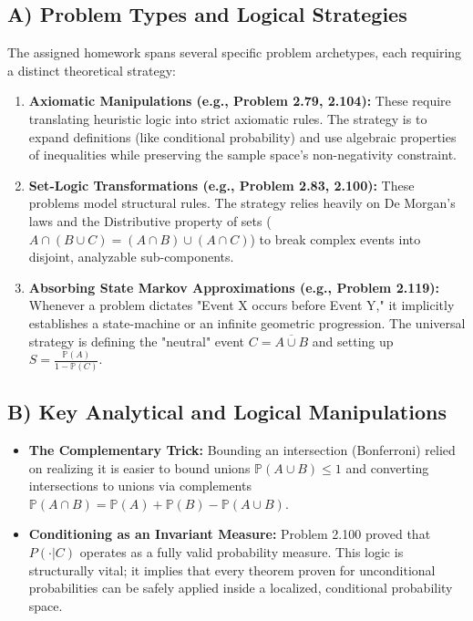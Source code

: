 \documentclass[12pt]{article}
\theoremstyle{definition}
\theoremstyle{remark}
\begin{document}
\subsection{A) Problem Types and Logical Strategies}
The assigned homework spans several specific problem archetypes, each requiring a distinct theoretical strategy:
\begin{enumerate}
    \item \textbf{Axiomatic Manipulations (e.g., Problem 2.79, 2.104):} These require translating heuristic logic into strict axiomatic rules. The strategy is to expand definitions (like conditional probability) and use algebraic properties of inequalities while preserving the sample space's non-negativity constraint.
    \item \textbf{Set-Logic Transformations (e.g., Problem 2.83, 2.100):} These problems model structural rules. The strategy relies heavily on De Morgan's laws and the Distributive property of sets ($A \cap (B \cup C) = (A \cap B) \cup (A \cap C)$) to break complex events into disjoint, analyzable sub-components.
    \item \textbf{Absorbing State Markov Approximations (e.g., Problem 2.119):} Whenever a problem dictates "Event X occurs before Event Y," it implicitly establishes a state-machine or an infinite geometric progression. The universal strategy is defining the "neutral" event $C = \overline{A \cup B}$ and setting up $S = \frac{\mathbb{P}(A)}{1-\mathbb{P}(C)}$.
\end{enumerate}

\subsection{B) Key Analytical and Logical Manipulations}
\begin{itemize}
    \item \textbf{The Complementary Trick:} Bounding an intersection (Bonferroni) relied on realizing it is easier to bound unions $\mathbb{P}(A \cup B) \le 1$ and converting intersections to unions via complements $\mathbb{P}(A \cap B) = \mathbb{P}(A) + \mathbb{P}(B) - \mathbb{P}(A \cup B)$.
    \item \textbf{Conditioning as an Invariant Measure:} Problem 2.100 proved that $P(\cdot | C)$ operates as a fully valid probability measure. This logic is structurally vital; it implies that every theorem proven for unconditional probabilities can be safely applied inside a localized, conditional probability space.
\end{itemize}
\end{document}
